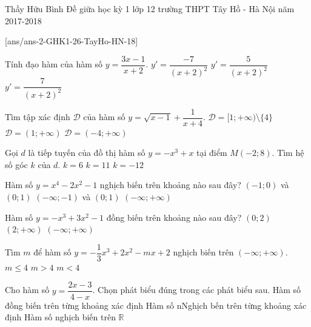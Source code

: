 \begin{name}
{Thầy Hữu Bình}
{Đề giữa học kỳ 1 lớp 12 trường THPT Tây Hồ - Hà Nội năm 2017-2018}
\end{name}
\setcounter{ex}{0}
[ans/ans-2-GHK1-26-TayHo-HN-18]


\begin{ex}%
Tính đạo hàm của hàm số $y=\dfrac{3x-1}{x+2}$.
{$y'=\dfrac{-7}{(x+2)^2}$}
{$y'=\dfrac{5}{(x+2)^2}$}
{\True $y'=\dfrac{7}{(x+2)^2}$}
\end{ex}

\begin{ex}%
Tìm tập xác định $\mathscr{D}$ của hàm số $y=\sqrt{x-1}+\dfrac{1}{x+4}$.
\choice{\True $\mathscr{D}=[1;+\infty)$}
{$\mathscr{D}=[1;+\infty)\setminus\{4\}$}
{$\mathscr{D}=(1;+\infty)$}
{$\mathscr{D}=(-4;+\infty)$}
\end{ex}

\begin{ex}%
Gọi $d$ là tiếp tuyến của đồ thị hàm số $y=-x^3+x$ tại điểm $M(-2;8)$. Tìm hệ số góc $k$ của $d$.
{$k=6$}
{$k=11$}
{$k=-12$}
\end{ex}

\begin{ex}%
Hàm số $y=x^4-2x^2-1$ nghịch biến trên khoảng nào sau đây?
{$(-1;0)$ và $(0;1)$}
{\True $(-\infty;-1)$ và $(0;1)$}
{$(-\infty;+\infty)$}
\end{ex}

\begin{ex}%
Hàm số $y=-x^3+3x^2-1$ đồng biến trên khoảng nào sau đây?
{\True $(0;2)$}
{$(2;+\infty)$}
{$(-\infty;+\infty)$}
\end{ex}

\begin{ex}%
Tìm $m$ để hàm số $y=-\dfrac{1}{3}x^3+2x^2-mx+2$ nghịch biến trên $(-\infty;+\infty)$.
{$m\leq 4$}
{$m>4$}
{$m<4$}
\end{ex}

\begin{ex}%
Cho hàm số $y=\dfrac{2x-3}{4-x}$. Chọn phát biểu đúng trong các phát biểu sau.
{\True Hàm số đồng biến trên từng khoảng xác định}
{Hàm số nNghịch bến trên từng khoảng xác định}
{Hàm số nghịch biến trên $\mathbb{R}$}
\end{ex}

